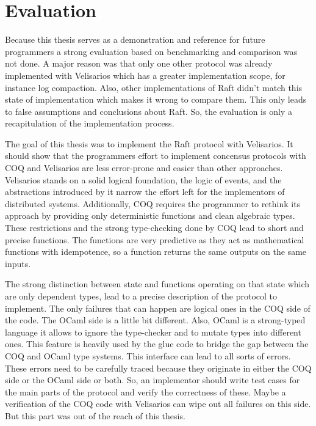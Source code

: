 %
\section{Evaluation}
\label{sec_5}

Because this thesis serves as a demonstration and
reference for future programmers a strong evaluation
based on benchmarking and comparison was not done.
A major reason was that only one other protocol
was already implemented with Velisarios which
has a greater implementation scope, for instance log compaction.
Also, other implementations of Raft didn't match this
state of implementation which makes it wrong to
compare them. This only leads to false assumptions
and conclusions about Raft. So, the evaluation
is only a recapitulation of the implementation process.

The goal of this thesis was to implement the Raft protocol
with Velisarios. It should show that the programmers
effort to implement concensus protocols with COQ and
Velisarios are less error-prone and easier than other
approaches. Velisarios stands on a solid
logical foundation, the logic of events, and the
abstractions introduced by it narrow the effort
left for the implementors of distributed systems.
Additionally, COQ requires the programmer to rethink
its approach by providing only deterministic functions
and clean algebraic types. These restrictions and
the strong type-checking done by COQ lead to short and
precise functions. The functions are very predictive as they
act as mathematical functions with idempotence, so
a function returns the same outputs on the same inputs.

The strong distinction between state and functions operating
on that state which are only dependent types, lead to a
precise description of the protocol to implement.
The only failures that can happen are logical ones
in the COQ side of the code. The OCaml side is a little
bit different. Also, OCaml is a strong-typed language
it allows to ignore the type-checker and to mutate
types into different ones. This feature is heavily
used by the glue code to bridge the gap between
the COQ and OCaml type systems. This interface
can lead to all sorts of errors. These errors need
to be carefully traced because they originate in either
the COQ side or the OCaml side or both. So, an implementor
should write test cases for the main parts of the protocol
and verify the correctness of these. Maybe a verification
of the COQ code with Velisarios 
can wipe out all failures on this side. But this part
was out of the reach of this thesis. 

